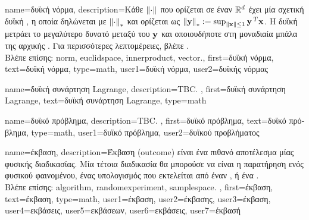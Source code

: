 {name={\foreignlanguage{greek}{δυϊκή νόρμα}},
	description={\foreignlanguage{greek}{Κάθε}  $\normgeneric{\cdot}{}$ \foreignlanguage{greek}{που ορίζεται σε έναν} 
		 $\mathbb{R}^{d}$ \foreignlanguage{greek}{έχει μία σχετική δυϊκή}
		, \foreignlanguage{greek}{η οποία δηλώνεται με 
		$\normgeneric{\cdot}{*}$ και ορίζεται ως $\normgeneric{\vy}{*} \defeq \sup_{\norm{\vx}{} \le 1} \vy\,^{T} \vx$. 
		Η δυϊκή}  \foreignlanguage{greek}{μετράει το μεγαλύτερο δυνατό}  
		\foreignlanguage{greek}{μεταξύ του ${\bf y}$ και οποιουδήποτε}  \foreignlanguage{greek}{στη μοναδιαία μπάλα 
		της αρχικής} . \foreignlanguage{greek}{Για περισσότερες λεπτομέρειες, βλέπε} 
		\cite[\foreignlanguage{greek}{Ενότητα}~A.1.6]{BoydConvexBook}.
					\\ 
		\foreignlanguage{greek}{Βλέπε επίσης:} \gls{norm}, \gls{euclidspace}, \gls{innerproduct}, \gls{vector}.},
	first={\foreignlanguage{greek}{δυϊκή νόρμα}},
	text={\foreignlanguage{greek}{δυϊκή νόρμα}},
	type=math,
	user1={\foreignlanguage{greek}{δυϊκή νόρμα}}, %
	user2={\foreignlanguage{greek}{δυϊκής νόρμας}} %
}

{name={\foreignlanguage{greek}{δυϊκή συνάρτηση} Lagrange},
	description={TBC. },
	first={\foreignlanguage{greek}{δυϊκή συνάρτηση} Lagrange},
	text={\foreignlanguage{greek}{δυϊκή συνάρτηση} Lagrange},
	type=math
}

{name={\foreignlanguage{greek}{δυϊκό πρόβλημα}},
	description={TBC. },
	first={\foreignlanguage{greek}{δυϊκό πρόβλημα}},
	text={\foreignlanguage{greek}{δυϊκό πρόβλημα}},
	type=math,
	user1={\foreignlanguage{greek}{δυϊκό πρόβλημα}}, %
	user2={\foreignlanguage{greek}{δυϊκού προβλήματος}} %
}

{name={\foreignlanguage{greek}{έκβαση}}, 
  	description={\foreignlanguage{greek}{Έκβαση} (outcome) 
		\foreignlanguage{greek}{είναι ένα πιθανό αποτέλεσμα}
		\foreignlanguage{greek}{μίας φυσικής διαδικασίας. Μία τέτοια διαδικασία θα μπορούσε να είναι 
		η παρατήρηση ενός φυσικού φαινομένου, ένας υπολογισμός που εκτελείται  
		από έναν} , \foreignlanguage{greek}{ή ένα}  
		\cite{BillingsleyProbMeasure}. 
		\\
 		\foreignlanguage{greek}{Βλέπε επίσης:} \gls{algorithm}, \gls{randomexperiment}, \gls{samplespace}. },  
  	first={\foreignlanguage{greek}{έκβαση}},
  	text={\foreignlanguage{greek}{έκβαση}},
	type=math,
	user1={\foreignlanguage{greek}{έκβαση}}, %
	user2={\foreignlanguage{greek}{έκβασης}}, %
	user3={\foreignlanguage{greek}{έκβαση}}, %
	user4={\foreignlanguage{greek}{εκβάσεις}}, %
	user5={\foreignlanguage{greek}{εκβάσεων}}, %
	user6={\foreignlanguage{greek}{εκβάσεις}}, %
	user7={\foreignlanguage{greek}{έκβασή}} %
}

